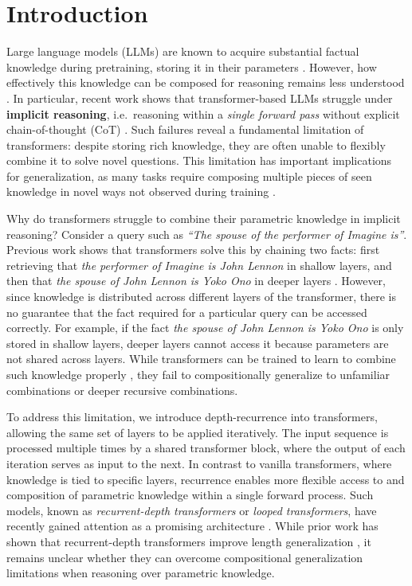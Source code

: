 \section{Introduction}
Large language models (LLMs) \citep{brown2020language} are known to acquire substantial factual knowledge during pretraining, storing it in their parameters \citep{geva-etal-2023-dissecting}. 
However, how effectively this knowledge can be composed for reasoning remains less understood \citep{10.5555/3666122.3669203, press-etal-2023-measuring}.
In particular, recent work shows that transformer-based LLMs struggle under \textbf{implicit reasoning}, i.e.\ reasoning within a \textit{single forward pass} without explicit chain-of-thought (CoT) \citep{wei2022chain}. 
Such failures reveal a fundamental limitation of transformers: despite storing rich knowledge, they are often unable to flexibly combine it to solve novel questions.
This limitation has important implications for generalization, as many tasks require composing multiple pieces of seen knowledge in novel ways not observed during training \citep{lake2018generalization, berglund2023reversal}.

Why do transformers struggle to combine their parametric knowledge in implicit reasoning? 
Consider a query such as \textit{“The spouse of the performer of Imagine is”}. 
Previous work shows that transformers solve this by chaining two facts: first retrieving that \textit{the performer of Imagine is John Lennon} in shallow layers, and then that \textit{the spouse of John Lennon is Yoko Ono} in deeper layers \citep{biran-etal-2024-hopping, 10.5555/3737916.3740933, yang-etal-2024-large-language-models}. 
However, since knowledge is distributed across different layers of the transformer, there is no guarantee that the fact required for a particular query can be accessed correctly.
For example, if the fact \textit{the spouse of John Lennon is Yoko Ono} is only stored in shallow layers, deeper layers cannot access it because parameters are not shared across layers. 
While transformers can be trained to learn to combine such knowledge properly \citep{10.5555/3737916.3740933, yao-etal-2025-language-models}, they fail to compositionally generalize to unfamiliar combinations or deeper recursive combinations.

To address this limitation, we introduce depth-recurrence into transformers, allowing the same set of layers to be applied iteratively. The input sequence is processed multiple times by a shared transformer block, where the output of each iteration serves as input to the next. 
In contrast to vanilla transformers, where knowledge is tied to specific layers, recurrence enables more flexible access to and composition of parametric knowledge within a single forward process.
Such models, known as \textit{recurrent-depth transformers} or \textit{looped transformers}, have recently gained attention as a promising architecture \citep{dehghani2018universal, geiping2025scaling, zhu2025scaling}.
While prior work has shown that recurrent-depth transformers improve length generalization \citep{bansal2022end, fan2024looped}, it remains unclear whether they can overcome compositional generalization limitations when reasoning over parametric knowledge.

